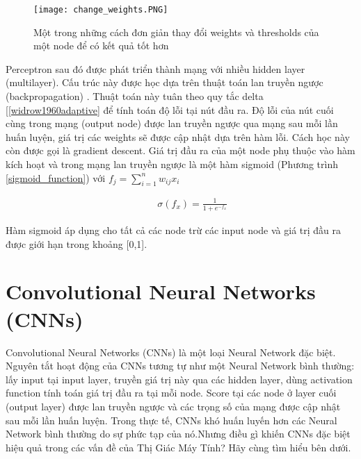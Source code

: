 \begin{figure}[h!]
	\centering
	\captionsetup{width=0.7\textwidth}
	\texttt{[image: change\_weights.PNG]}
	\caption{Một trong những cách đơn giản thay đổi weights và thresholds của một node để có kết quả tốt hơn}
    \label{fig:change_weights}
\end{figure}

Perceptron sau đó được phát triển thành mạng với nhiều hidden layer (multilayer). Cấu trúc này được học dựa trên thuật toán lan truyền ngược (backpropagation) \cite{sampson1987parallel}. Thuật toán này tuân theo quy tắc delta [\ref{widrow1960adaptive} để tính toán độ lỗi tại nút đầu ra. Độ lỗi của nút cuối cùng trong mạng (output node) được lan truyền ngược qua mạng sau mỗi lần huấn luyện, giá trị các weights sẽ 	được cập nhật dựa trên hàm lỗi. Cách học này còn được gọi là gradient descent. 
Giá trị đầu ra của một node phụ thuộc vào hàm kích hoạt và trong mạng lan truyền ngược là một hàm sigmoid (Phương trình \ref{sigmoid_function}) với $f_{j} = \sum_{i=1}^{n} {w_{ij}x_i}$

\begin{eqnarray}
	\label{eq:sigmoid_function}
	\hspace{1cm} \sigma(f_x) = \frac{1}{1 + e^{-f_x}}
\end{eqnarray}

Hàm sigmoid áp dụng cho tất cả các node trừ các input node và giá trị đầu ra được giới hạn trong khoảng [0,1].

\section{Convolutional Neural Networks (CNNs)}
Convolutional Neural Networks (CNNs) là một loại Neural Network đặc biệt. Nguyên tắt hoạt động của CNNs tương tự như một Neural Network bình thường: lấy input tại input layer, truyền giá trị này qua các hidden layer, dùng activation function tính toán giá trị đầu ra tại mỗi node. Score tại các node ở layer cuối (output layer) được lan truyền ngược và các trọng số của mạng được cập nhật sau mỗi lần huấn luyện. Trong thực tế, CNNs khó huấn luyến hơn các Neural Network bình thường do sự phức tạp của nó.Nhưng điều gì khiến CNNs đặc biệt hiệu quả trong các vấn đề của Thị Giác Máy Tính? Hãy cùng tìm hiểu bên dưới.

